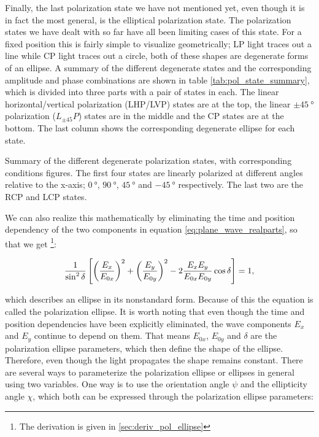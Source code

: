Finally, the last polarization state we have not mentioned yet, even though it is in fact the most general, is the elliptical polarization state. The polarization states we have dealt with so far have all been limiting cases of this state. For a fixed position this is fairly simple to visualize geometrically; LP light traces out a line while CP light traces out a circle, both of these shapes are degenerate forms of an ellipse. A summary of the different degenerate states and the corresponding amplitude and phase combinations are shown in table \ref{tab:pol_state_summary}, which is divided into three parts with a pair of states in each. The linear horizontal/vertical polarization (LHP/LVP) states are at the top, the linear $\pm\SI{45}{\degree}$ polarization ($L_{\pm45}P$) states are in the middle and the CP states are at the bottom. The last column shows the corresponding degenerate ellipse for each state.

\begin{table}[h]
    \centering
    
    \caption{Summary of the different degenerate polarization states, with corresponding conditions figures. The first four states are linearly polarized at different angles relative to the x-axis; $\SI{0}{\degree}$, $\SI{90}{\degree}$, $\SI{45}{\degree}$ and $\SI{-45}{\degree}$ respectively. The last two are the RCP and LCP states.}
    \label{tab:pol_state_summary}
\end{table}

We can also realize this mathematically by eliminating the time and position dependency of the two components in equation \ref{eq:plane_wave_realparts}, so that we get \footnote{The derivation is given in \ref{sec:deriv_pol_ellipse}}:

\begin{equation}
    \centering
    \label{eq:pol_ellipse}
    \frac{1}{\sin^2 \delta} \left[ \left(\frac{E_x}{E_{0x}}\right)^2+\left(\frac{E_y}{E_{0y}}\right)^2-2\frac{E_x E_y}{E_{0x} E_{0y}}\cos \delta \right]=1,
\end{equation}

which describes an ellipse in its nonstandard form. Because of this the equation is called the polarization ellipse. It is worth noting that even though the time and position dependencies have been explicitly eliminated, the wave components $E_x$ and $E_y$ continue to depend on them. That means $E_{0x}$, $E_{0y}$ and $\delta$ are the polarization ellipse parameters, which then define the shape of the ellipse. Therefore, even though the light propagates the shape remains constant. There are several ways to parameterize the polarization ellipse or ellipses in general using two variables. One way is to use the orientation angle $\psi$ and the ellipticity angle $\chi$, which both can be expressed through the polarization ellipse parameters: 

